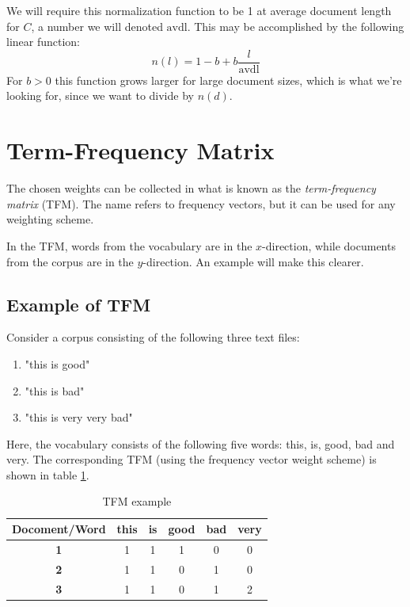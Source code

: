 \documentclass[12pt, a4paper]{article}
\numberwithin{equation}{section}
\begin{document}
We will require this normalization function to be 1 at average document length for $C$, a number we will denoted $\textrm{avdl}$. This may be accomplished by the following linear function:
\begin{equation}
n(l)=1-b+b\frac{l}{\textrm{avdl}}
\end{equation}
For $b>0$ this function grows larger for large document sizes, which is what we're looking for, since we want to divide by $n(d)$.

\section{Term-Frequency Matrix}
The chosen weights can be collected in what is known as the \textit{term-frequency matrix} (TFM). The name refers to frequency vectors, but it can be used for any weighting scheme. 

In the TFM, words from the vocabulary are in the $x$-direction, while documents from the corpus are in the $y$-direction. An example will make this clearer.

\subsection{Example of TFM}
Consider a corpus consisting of the following three text files:
\begin{enumerate}
\item "this is good"
\item "this is bad"
\item "this is very very bad"
\end{enumerate}
Here, the vocabulary consists of the following five words: this, is, good, bad and very. The corresponding TFM (using the frequency vector weight scheme) is shown in table \ref{table:TFM}.

\begin{table}[t]
\centering
\label{table:TFM}
\begin{tabular}{c|c|c|c|c|c|}
\cline{2-6}
\multicolumn{1}{l|}{Docoment/Word} & \multicolumn{1}{l|}{\textbf{this}} & \multicolumn{1}{l|}{\textbf{is}} & \multicolumn{1}{l|}{\textbf{good}} & \multicolumn{1}{l|}{\textbf{bad}} & \multicolumn{1}{l|}{\textbf{very}} \\ \hline
\multicolumn{1}{|c|}{\textbf{1}}   & 1                                  & 1                                & 1                                  & 0                                 & 0                                  \\ \hline
\multicolumn{1}{|c|}{\textbf{2}}   & 1                                  & 1                                & 0                                  & 1                                 & 0                                  \\ \hline
\multicolumn{1}{|c|}{\textbf{3}}   & 1                                  & 1                                & 0                                  & 1                                 & 2                                  \\ \hline
\end{tabular}
\caption{TFM example}
\end{table}
\end{document}
